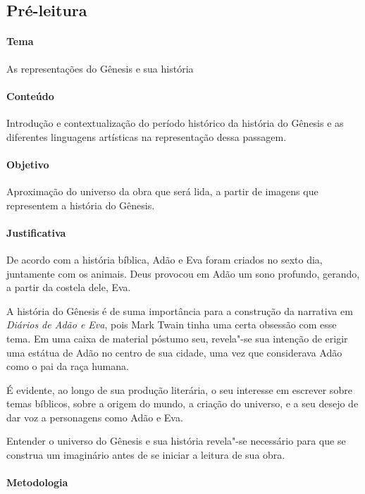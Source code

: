 \documentclass[12pt]{extarticle}
\begin{document}
\subsection{Pré-leitura}

\paragraph{Tema} As representações do Gênesis e sua história

\paragraph{Conteúdo} Introdução e contextualização do período histórico
da história do Gênesis e as diferentes linguagens
artísticas na representação dessa passagem.

\paragraph{Objetivo} Aproximação do universo da obra que será lida, a partir 
de imagens que representem a história do Gênesis. 

\paragraph{Justificativa} De acordo com a história bíblica, Adão e Eva foram 
criados no sexto dia, juntamente com os animais. Deus provocou em Adão um sono 
profundo, gerando, a partir da costela dele, Eva. 

A história do Gênesis é de suma importância para a construção da narrativa em 
\emph{Diários de Adão e Eva}, pois Mark Twain tinha uma certa obsessão com esse 
tema. Em uma caixa de material póstumo seu, revela"-se sua intenção de erigir 
uma estátua de Adão no centro de sua cidade, uma vez que considerava Adão como o 
pai da raça humana. 

É evidente, ao longo de sua produção literária, o seu
interesse em escrever sobre temas bíblicos, sobre a origem
do mundo, a criação do universo, e a seu desejo de dar
voz a personagens como Adão e Eva. 

Entender o universo do Gênesis e sua história revela"-se necessário para que 
se construa um imaginário antes de se iniciar a leitura de sua obra. 

\paragraph{Metodologia}
\end{document}
